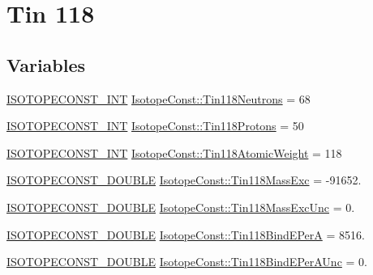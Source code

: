 \hypertarget{group___isotope_const-_tin-_sn118}{}\section{Tin 118}
\label{group___isotope_const-_tin-_sn118}
\subsection*{Variables}
\begin{DoxyCompactItemize}
\item 
\mbox{\hyperlink{group___isotope_const-_macros_ga5f18360b3e99483a35c32d789e62621c}{I\+S\+O\+T\+O\+P\+E\+C\+O\+N\+S\+T\+\_\+\+I\+NT}} \mbox{\hyperlink{group___isotope_const-_tin-_sn118_gab13d5b943667c1723cd6b4d62650ce39}{Isotope\+Const\+::\+Tin118\+Neutrons}} = 68
\item 
\mbox{\hyperlink{group___isotope_const-_macros_ga5f18360b3e99483a35c32d789e62621c}{I\+S\+O\+T\+O\+P\+E\+C\+O\+N\+S\+T\+\_\+\+I\+NT}} \mbox{\hyperlink{group___isotope_const-_tin-_sn118_ga3d961ce70e6a5cf219ef6a06017464f3}{Isotope\+Const\+::\+Tin118\+Protons}} = 50
\item 
\mbox{\hyperlink{group___isotope_const-_macros_ga5f18360b3e99483a35c32d789e62621c}{I\+S\+O\+T\+O\+P\+E\+C\+O\+N\+S\+T\+\_\+\+I\+NT}} \mbox{\hyperlink{group___isotope_const-_tin-_sn118_ga2b137df3ad4a45431a059873eaaf2e8b}{Isotope\+Const\+::\+Tin118\+Atomic\+Weight}} = 118
\item 
\mbox{\hyperlink{group___isotope_const-_macros_ga8f45a7272ce02c0b4c65c44636ed719a}{I\+S\+O\+T\+O\+P\+E\+C\+O\+N\+S\+T\+\_\+\+D\+O\+U\+B\+LE}} \mbox{\hyperlink{group___isotope_const-_tin-_sn118_ga080ea606821814618016c8a120207eff}{Isotope\+Const\+::\+Tin118\+Mass\+Exc}} = -\/91652.
\item 
\mbox{\hyperlink{group___isotope_const-_macros_ga8f45a7272ce02c0b4c65c44636ed719a}{I\+S\+O\+T\+O\+P\+E\+C\+O\+N\+S\+T\+\_\+\+D\+O\+U\+B\+LE}} \mbox{\hyperlink{group___isotope_const-_tin-_sn118_gafb019ce880941f02b44726bfffab0b5c}{Isotope\+Const\+::\+Tin118\+Mass\+Exc\+Unc}} = 0.
\item 
\mbox{\hyperlink{group___isotope_const-_macros_ga8f45a7272ce02c0b4c65c44636ed719a}{I\+S\+O\+T\+O\+P\+E\+C\+O\+N\+S\+T\+\_\+\+D\+O\+U\+B\+LE}} \mbox{\hyperlink{group___isotope_const-_tin-_sn118_gaab65b6361170b096b178985e8f3d72b5}{Isotope\+Const\+::\+Tin118\+Bind\+E\+PerA}} = 8516.
\item 
\mbox{\hyperlink{group___isotope_const-_macros_ga8f45a7272ce02c0b4c65c44636ed719a}{I\+S\+O\+T\+O\+P\+E\+C\+O\+N\+S\+T\+\_\+\+D\+O\+U\+B\+LE}} \mbox{\hyperlink{group___isotope_const-_tin-_sn118_ga99c019c0b95977e6114c3e1a74ef9b4a}{Isotope\+Const\+::\+Tin118\+Bind\+E\+Per\+A\+Unc}} = 0.

\end{DoxyCompactItemize}
